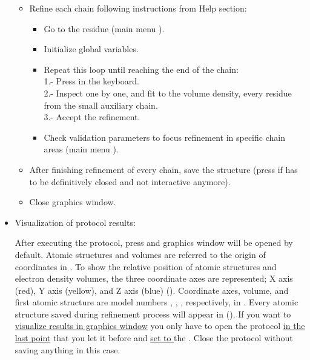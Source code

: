 \begin{itemize}
\begin{itemize}
    \item Refine each chain following instructions from Help section:
     \begin{itemize}
      \item Go to the residue  (\coot main menu ).
      \item Initialize global variables.
      \item Repeat this loop until reaching the end of the chain:\\
      
        1.- Press  in the keyboard.\\
        2.- Inspect one by one, and fit to the volume density, every residue from the small auxiliary chain.\\
        3.- Accept the refinement.\\
       
      \item Check validation parameters to focus refinement in specific chain areas (\coot main menu ).
     \end{itemize} 
    \item After finishing refinement of every chain, save the structure (press  if \coot has to be definitively closed and not interactive anymore).
    \item Close \coot graphics window.
  \end{itemize}  

  
  \item Visualization of protocol results:
  
  After executing the protocol, press  and \chimera graphics window will be opened by default. Atomic structures and volumes are referred to the origin of coordinates in \chimera. To show the relative position of atomic structures and electron density volumes, the three coordinate axes are represented; X axis (red), Y axis (yellow), and Z axis (blue) (). Coordinate axes, volume, and first atomic structure are model numbers , , , respectively, in \chimera {}. Every atomic structure saved during \coot refinement process will appear in  (). If you want to \underline{visualize results in \coot graphics window} you only have to open the protocol \underline{in the last point} that you let it before and \underline{set to } the . Close the \coot protocol without saving anything in this case. 
  

\end{itemize}
